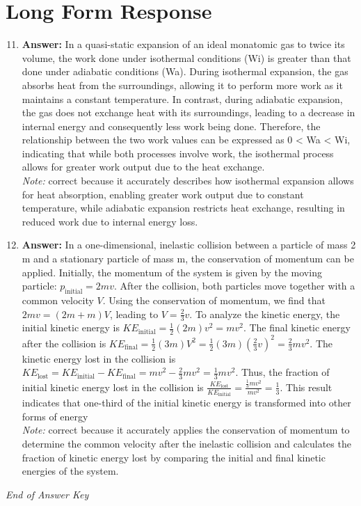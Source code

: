 \documentclass[12pt]{article}
\begin{document}
\section*{Long Form Response}
\begin{enumerate}[label=\arabic*.]
\setcounter{enumi}{10}
\item \textbf{Answer:} In a quasi-static expansion of an ideal monatomic gas to twice its volume, the work done under isothermal conditions (Wi) is greater than that done under adiabatic conditions (Wa). During isothermal expansion, the gas absorbs heat from the surroundings, allowing it to perform more work as it maintains a constant temperature. In contrast, during adiabatic expansion, the gas does not exchange heat with its surroundings, leading to a decrease in internal energy and consequently less work being done. Therefore, the relationship between the two work values can be expressed as 0 \textless{} Wa \textless{} Wi, indicating that while both processes involve work, the isothermal process allows for greater work output due to the heat exchange.
\\ \textit{Note:} correct because it accurately describes how isothermal expansion allows for heat absorption, enabling greater work output due to constant temperature, while adiabatic expansion restricts heat exchange, resulting in reduced work due to internal energy loss.
\item \textbf{Answer:} In a one-dimensional, inelastic collision between a particle of mass 2 m and a stationary particle of mass m, the conservation of momentum can be applied. Initially, the momentum of the system is given by the moving particle: \( p_{\text{initial}} = 2 mv \). After the collision, both particles move together with a common velocity \( V \). Using the conservation of momentum, we find that \( 2 mv = (2 m + m)V \), leading to \( V = \frac{2}{3}v \). To analyze the kinetic energy, the initial kinetic energy is \( KE_{\text{initial}} = \frac{1}{2}(2 m)v^2 = mv^2 \). The final kinetic energy after the collision is \( KE_{\text{final}} = \frac{1}{2}(3 m)V^2 = \frac{1}{2}(3 m)\left(\frac{2}{3}v\right)^2 = \frac{2}{3}mv^2 \). The kinetic energy lost in the collision is \( KE_{\text{lost}} = KE_{\text{initial}} - KE_{\text{final}} = mv^2 - \frac{2}{3}mv^2 = \frac{1}{3}mv^2 \). Thus, the fraction of initial kinetic energy lost in the collision is \( \frac{KE_{\text{lost}}}{KE_{\text{initial}}} = \frac{\frac{1}{3}mv^2}{mv^2} = \frac{1}{3} \). This result indicates that one-third of the initial kinetic energy is transformed into other forms of energy
\\ \textit{Note:} correct because it accurately applies the conservation of momentum to determine the common velocity after the inelastic collision and calculates the fraction of kinetic energy lost by comparing the initial and final kinetic energies of the system.
\end{enumerate}

\vfill
\noindent\textit{End of Answer Key}
\end{document}
